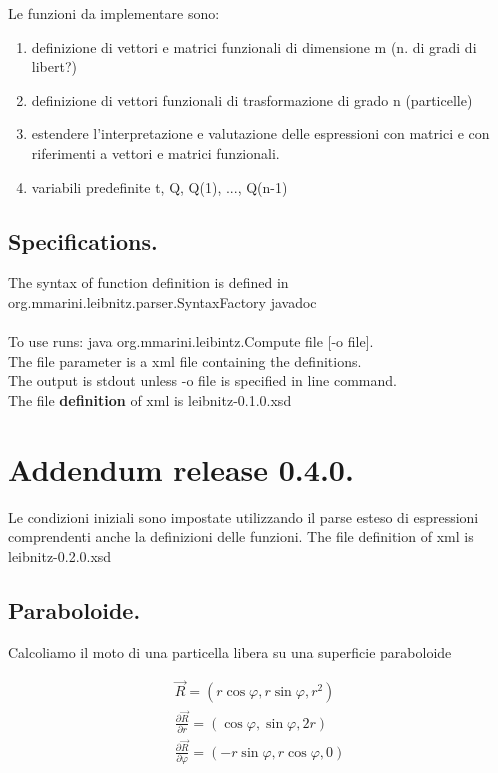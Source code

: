 \documentclass[a4paper,twoside]{article}
\begin{document}
Le funzioni da implementare sono:

\begin{enumerate}
\item definizione di vettori e matrici funzionali di dimensione m (n. di gradi di libert?)
\item definizione di vettori funzionali di trasformazione di grado n (particelle)
\item estendere l'interpretazione e valutazione delle espressioni con matrici e con riferimenti a vettori e matrici funzionali.
\item variabili predefinite t,  Q, Q(1), ..., Q(n-1)
\end{enumerate}


\subsection{Specifications.}

The syntax of function definition is defined in org.mmarini.leibnitz.parser.SyntaxFactory javadoc
\\
\\
To use runs: java org.mmarini.leibintz.Compute file [-o file].
\\
The file parameter is a xml file containing the definitions.
\\
The output is stdout unless -o file is specified in line command.
\\

The file \textbf{definition} of xml is leibnitz-0.1.0.xsd


\section{Addendum release 0.4.0.}

Le condizioni iniziali sono impostate utilizzando il parse esteso di espressioni comprendenti anche la definizioni delle funzioni.
The file definition of xml is leibnitz-0.2.0.xsd


\subsection{Paraboloide.}

Calcoliamo il moto di una particella libera su una superficie paraboloide

\begin{eqnarray}
\vec R=(r \cos \varphi, r \sin \varphi, r^2)
\\
\frac{\partial \vec R}{\partial r }=(\cos \varphi,\sin \varphi, 2r)
\\
\frac{\partial \vec R}{\partial\varphi }=(-r \sin \varphi, r\cos \varphi, 0)
\end{eqnarray}
\end{document}
